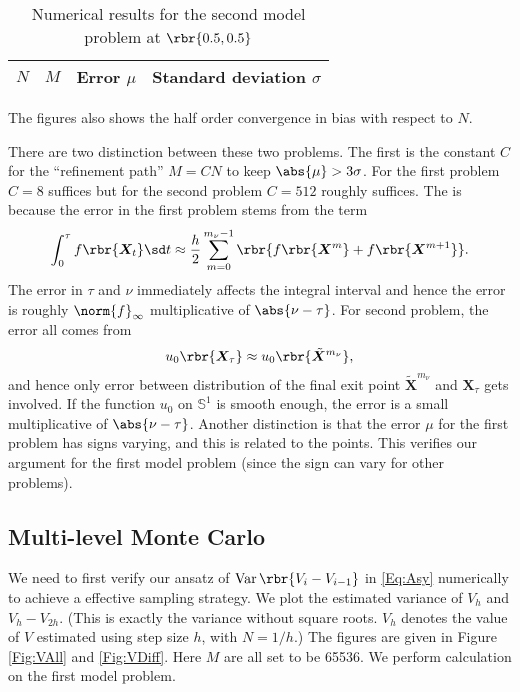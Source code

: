 \documentclass[english, nochinese]{pnote}
\DeclareMathOperator\opvar{\mathrm{Var}}
\begin{document}
\begin{table}[htbp]
\centering
\begin{tabular}{|c|c|c|c|}
\hline
$N$ & $M$ & Error $\mu$ & Standard deviation $\sigma$ \\
\hline

\end{tabular}
\caption{Numerical results for the second model problem at $ \rbr{ 0.5, 0.5 } $}
\label{Tbl:EM23}
\end{table}

The figures also shows the half order convergence in bias with respect to $N$.

There are two distinction between these two problems. The first is the constant $C$ for the ``refinement path'' $ M = C N $ to keep $ \abs{\mu} > 3 \sigma $. For the first problem $ C = 8 $ suffices but for the second problem $ C = 512 $ roughly suffices. The is because the error in the first problem stems from the term
\begin{equation}
\int_0^{\tau} f \rbr{\bm{X}_t} \sd t \approx \frac{h}{2} \sum_{ m = 0 }^{ m_{\nu} - 1 } \rbr{ f \rbr{\bm{X}^{m}} + f \rbr{\bm{X}^{ m + 1 }}}.
\end{equation}
The error in $\tau$ and $\nu$ immediately affects the integral interval and hence the error is roughly $\norm{f}_{\infty}$ multiplicative of $ \abs{ \nu - \tau } $. For second problem, the error all comes from
\begin{equation}
u_0 \rbr{\bm{X}_{\tau}} \approx u_0 \rbr{\tilde{\bm{X}}^{m_{\nu}}},
\end{equation}
and hence only error between distribution of the final exit point $\tilde{\bm{X}}^{m_{\nu}}$ and $\bm{X}_{\tau}$ gets involved. If the function $u_0$ on $\mathbb{S}^1$ is smooth enough, the error is a small multiplicative of $ \abs{ \nu - \tau } $. Another distinction is that the error $\mu$ for the first problem has signs varying, and this is related to the points. This verifies our argument for the first model problem (since the sign can vary for other problems).

\subsection{Multi-level Monte Carlo}

We need to first verify our ansatz of $ \opvar \rbr{ V_i - V_{ i - 1 } } $ in \eqref{Eq:Asy} numerically to achieve a effective sampling strategy. We plot the estimated variance of $V_h$ and $ V_h - V_{ 2 h } $. (This is exactly the variance without square roots. $V_h$ denotes the value of $V$ estimated using step size $h$, with $ N = 1 / h $.)  The figures are given in Figure \ref{Fig:VAll} and \ref{Fig:VDiff}. Here $M$ are all set to be 65536. We perform calculation on the first model problem.
\end{document}
